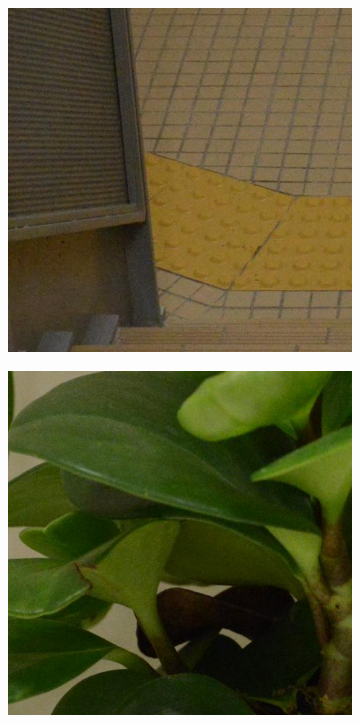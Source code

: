 \begin{figure}
\begin{subfigure}[t]{0.19\textwidth}
    \end{subfigure}
    \hfill
    \begin{subfigure}[t]{0.19\textwidth}
        \centering
        \includegraphics[width=1\textwidth]{images/dataset/NikonD800_5_125_6400_stair_3_real.JPG}
    \end{subfigure}
    \hfill
    \begin{subfigure}[t]{0.19\textwidth}
        \centering
        \includegraphics[width=1\textwidth]{images/dataset/NikonD800_6-3_125_5000_plant_1_real.JPG}

\end{subfigure}
\end{figure}
